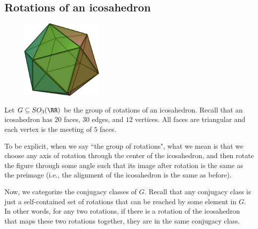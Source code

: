 \subsection{Rotations of an icosahedron}

\begin{figure}[h]
\centering
\includegraphics[width=4cm]{images/icosahedron.jpeg}
\end{figure}

Let $G\subseteq SO_3(\RR)$ be the group of rotations of an icosahedron. Recall that an icosahedron has $20$ faces, $30$ edges, and $12$ vertices. All faces are triangular and each vertex is the meeting of $5$ faces. 

To be explicit, when we say ``the group of rotations", what we mean is that we choose any axis of rotation through the center of the icosahedron, and then rotate the figure through some angle such that its image after rotation is the same as the preimage (i.e., the alignment of the icosahedron is the same as before). 

Now, we categorize the conjugacy classes of $G$. Recall that any conjugacy class is just a self-contained set of rotations that can be reached by some element in $G$. In other words, for any two rotations, if there is a rotation of the icosahedron that maps these two rotations together, they are in the same conjugacy class. 

